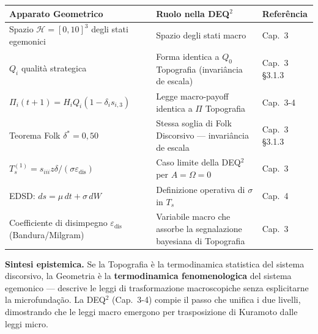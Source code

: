 {\def\LTcaptype{none} %
{\small\begin{longtable}[]{@{}
  >{\raggedright\arraybackslash}p{}
  >{\raggedright\arraybackslash}p{}
  >{\raggedright\arraybackslash}p{}@{}}
\toprule\noalign{}
\begin{minipage}[b]{\linewidth}\raggedright
Apparato Geometrico
\end{minipage} & \begin{minipage}[b]{\linewidth}\raggedright
Ruolo nella DEQ$^2$
\end{minipage} & \begin{minipage}[b]{\linewidth}\raggedright
Referência
\end{minipage} \\
\midrule\noalign{}
\endhead
\bottomrule\noalign{}
\endlastfoot
Spazio \(\mathcal{H} = [0,10]^3\) degli stati egemonici & Spazio degli
stati macro & Cap.~3 \\
\(Q_i\) qualità strategica & Forma identica a \(Q_0\) Topografia
(invariância de escala) & Cap.~3 \S{}3.1.3 \\
\(\Pi_i(t+1) = H_i Q_i (1 - \delta_i s_{i,3})\) & Legge macro-payoff
identica a $\Pi$ Topografia & Cap.~3-4 \\
Teorema Folk \(\delta^* = 0{,}50\) & Stessa soglia di Folk Discorsivo
--- invariância de escala & Cap.~3 \S{}3.1.3 \\
\(T_s^{(1)} = s_{iii} z \delta / (\sigma \varepsilon_{\text{dis}})\) &
Caso limite della DEQ$^2$ per \(A = \Omega = 0\) & Cap.~3 \\
EDSD: \(ds = \mu\, dt + \sigma\, dW\) & Definizione operativa di
\(\sigma\) in \(T_s\) & Cap.~4 \\
Coefficiente di disimpegno \(\varepsilon_{\text{dis}}\)
(Bandura/Milgram) & Variabile macro che assorbe la segnalazione
bayesiana di Topografia & Cap.~3 \\
\end{longtable}}
}

\Hypoth{} \textbf{Sintesi epistemica.} Se la Topografia è la
termodinamica statistica del sistema discorsivo, la Geometria è la
\textbf{termodinamica fenomenologica} del sistema egemonico --- descrive
le leggi di trasformazione macroscopiche senza esplicitarne la
microfundação. La DEQ$^2$ (Cap.~3-4) compie il passo che unifica i due
livelli, dimostrando che le leggi macro emergono per trasposizione di
Kuramoto dalle leggi micro.



